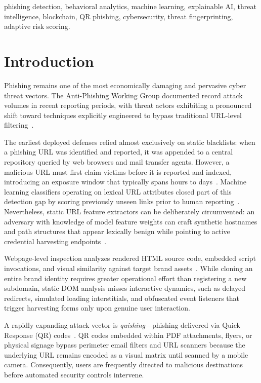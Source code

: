 \documentclass[conference]{IEEEtran}
\begin{document}
\begin{IEEEkeywords}
phishing detection, behavioral analytics, machine learning, explainable AI, threat intelligence,
blockchain, QR phishing, cybersecurity, threat fingerprinting, adaptive risk scoring.
\end{IEEEkeywords}

\section{Introduction}

Phishing remains one of the most economically damaging and pervasive cyber threat vectors.
The Anti-Phishing Working Group documented record attack volumes in recent reporting periods,
with threat actors exhibiting a pronounced shift toward techniques explicitly engineered to bypass
traditional URL-level filtering~\cite{ref1,ref2}.

The earliest deployed defenses relied almost exclusively on static blacklists: when a phishing URL
was identified and reported, it was appended to a central repository queried by web browsers and
mail transfer agents.
However, a malicious URL must first claim victims before it is reported and indexed, introducing an
exposure window that typically spans hours to days~\cite{ref3}.
Machine learning classifiers operating on lexical URL attributes closed part of this detection
gap by scoring previously unseen links prior to human reporting~\cite{ref4,ref5}.
Nevertheless, static URL feature extractors can be deliberately circumvented: an adversary with
knowledge of model feature weights can craft synthetic hostnames and path structures that appear
lexically benign while pointing to active credential harvesting endpoints~\cite{ref6}.

Webpage-level inspection analyzes rendered HTML source code, embedded script invocations, and visual
similarity against target brand assets~\cite{ref7,ref8,ref9}.
While cloning an entire brand identity requires greater operational effort than registering a new
subdomain, static DOM analysis misses interactive dynamics, such as delayed redirects, simulated
loading interstitials, and obfuscated event listeners that trigger harvesting forms only upon genuine
user interaction.

A rapidly expanding attack vector is \textit{quishing}---phishing delivered via Quick Response (QR)
codes~\cite{ref10}.
QR codes embedded within PDF attachments, flyers, or physical signage bypass perimeter email filters
and URL scanners because the underlying URL remains encoded as a visual matrix until scanned by a
mobile camera.
Consequently, users are frequently directed to malicious destinations before automated security
controls intervene.
\end{document}
